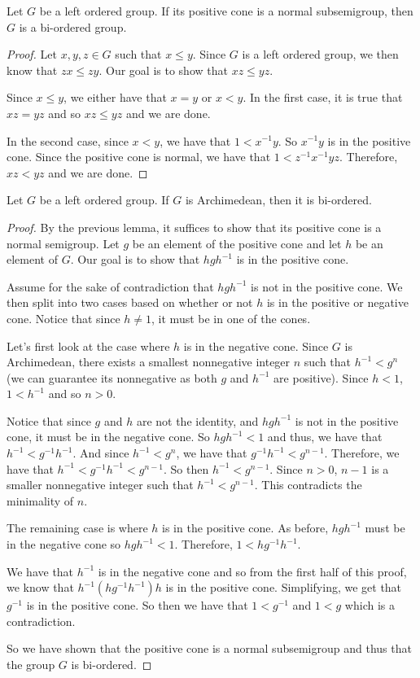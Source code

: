 \begin{lemma}\leanok
Let $G$ be a left ordered group. 
If its positive cone is a normal subsemigroup, then $G$ is a bi-ordered group.
\end{lemma}
\begin{proof}
Let $x,y,z \in G$ such that $x \le y$. Since $G$ is a left ordered group, we then know that $zx \le zy$.
Our goal is to show that $xz \le yz$.

Since $x \le y$, we either have that $x = y$ or $x < y$.
In the first case, it is true that $xz = yz$ and so $xz \le yz$ and we are done.

In the second case, since $x < y$, we have that $1 < x^{-1}y$.
So $x^{-1}y$ is in the positive cone. Since the positive cone is normal, we have that
$1 < z^{-1}x^{-1}yz$. Therefore, $xz < yz$ and we are done.
\end{proof}

\begin{lemma}\leanok
Let $G$ be a left ordered group.
If $G$ is Archimedean, then it is bi-ordered.
\end{lemma}
\begin{proof}
By the previous lemma, it suffices to show that its positive cone is a normal semigroup.
Let $g$ be an element of the positive cone and let $h$ be an element of $G$.
Our goal is to show that $hgh^{-1}$ is in the positive cone.

Assume for the sake of contradiction that $hgh^{-1}$ is not in the positive cone.
We then split into two cases based on whether or not $h$ is in the positive or negative cone.
Notice that since $h \ne 1$, it must be in one of the cones.

Let's first look at the case where $h$ is in the negative cone.
Since $G$ is Archimedean, there exists a smallest nonnegative integer $n$
such that $h^{-1} < g^n$ (we can guarantee its nonnegative as both $g$ and $h^{-1}$ are positive).
Since $h < 1$, $1 < h^{-1}$ and so $n > 0$.

Notice that since $g$ and $h$ are not the identity,
and $hgh^{-1}$ is not in the positive cone, it must be in the negative cone.
So $hgh^{-1} < 1$ and thus, we have that $h^{-1} < g^{-1}h^{-1}$. And since
$h^{-1} < g^n$, we have that $g^{-1}h^{-1} < g^{n-1}$. Therefore,
we have that $h^{-1} < g^{-1}h^{-1} < g^{n-1}$. So then $h^{-1} < g^{n-1}$.
Since $n > 0$, $n-1$ is a smaller nonnegative integer such that $h^{-1} < g^{n-1}$. 
This contradicts the minimality of $n$.

The remaining case is where $h$ is in the positive cone.
As before, $hgh^{-1}$ must be in the negative cone so
$hgh^{-1} < 1$. Therefore, $1 < hg^{-1}h^{-1}$.

We have that $h^{-1}$ is in the negative cone
and so from the first half of this proof, we know that
$h^{-1}(hg^{-1}h^{-1})h$ is in the positive cone.
Simplifying, we get that $g^{-1}$ is in the positive cone.
So then we have that $1 < g^{-1}$ and $1 < g$ which is a contradiction.

So we have shown that the positive cone is a normal subsemigroup
and thus that the group $G$ is bi-ordered.
\end{proof}

